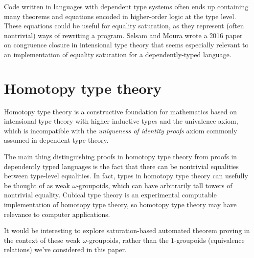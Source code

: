 \documentclass[11pt]{report}
\newcommand{\sfixme}[0]{%
  \begin{minipage}[c]{3.5em}%
  \todo[color=green!40,inline]{\textsc{fixme}}%
  \end{minipage}}
\begin{document}
Code written in languages with dependent type systems often ends up containing
many theorems and equations encoded in higher-order logic at the type level.
These equations could be useful for equality saturation, as they represent
(often nontrivial) ways of rewriting a program. Selsam and Moura wrote a 2016
paper \cite{selsam-2017} on congruence closure in intensional type theory that
seems especially relevant to an implementation of equality saturation for a
dependently-typed language.

\section{Homotopy type theory}
\label{sec:hott}

Homotopy type theory is a constructive foundation for mathematics based on
intensional type theory with higher inductive types and the univalence axiom,
which is incompatible with the \textit{uniqueness of identity proofs} axiom
commonly assumed in dependent type theory.

The main thing distinguishing proofs in homotopy type theory from proofs in
dependently typed languages is the fact that there can be nontrivial equalities
between type-level equalities. In fact, types in homotopy type theory can
usefully be thought of as weak $\omega$-groupoids, which can have arbitrarily
tall towers of nontrivial equality. Cubical type theory is an experimental
computable implementation of homotopy type theory, so homotopy type theory may
have relevance to computer applications.

It would be interesting to explore saturation-based automated theorem proving
in the context of these weak $\omega$-groupoids, rather than the $1$-groupoids
(equivalence relations) we've considered in this paper.

%
%




\printbibliography[heading=bibnumbered]{}

\end{document}
